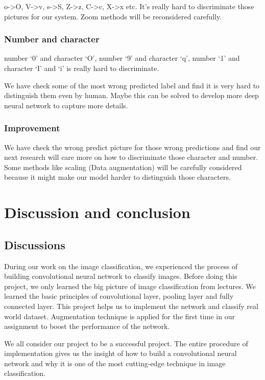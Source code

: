 \documentclass[twoside,twocolumn]{article}
\begin{document}
o->O, V->v, s->S, Z->z, C->c, X->x etc. It's really hard to discriminate those pictures for our system. Zoom methods will be reconsidered carefully. 

\subsubsection{Number and character}

number ‘0’ and character ‘O’, number ‘9’ and character ‘q’, number ‘1’ and character ‘I’ and ‘i’ is really hard to discriminate.

We have check some of the most wrong predicted label and find it is very hard to distinguish them even by human. Maybe this can be solved to develop more deep neural network to capture more details.

\subsubsection{Improvement}

We have check the wrong predict picture for those wrong predictions and find our next research will care more on how to discriminate those character and number. Some methods like scaling (Data augmentation) will be carefully considered because it might make our model harder to distinguish those characters.


\section{Discussion and conclusion}
\subsection{Discussions}

During our work on the image classification, we experienced the process of building convolutional neural network to classify images. Before doing this project, we only learned the big picture of image classification from lectures. We learned the basic principles of convolutional layer, pooling layer and fully connected layer. This project helps us to implement the network and classify real world dataset. Augmentation technique is applied for the first time in our assignment to boost the performance of the network.

We all consider our project to be a successful project. The entire procedure of implementation gives us the insight of how to build a convolutional neural network and why it is one of the most cutting-edge technique in image classification.
\end{document}
